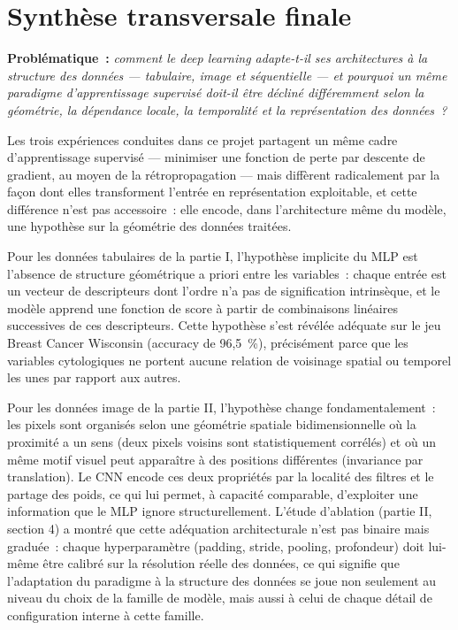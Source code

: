\documentclass[11pt,a4paper]{article}
\begin{document}
\newpage
\section{Synthèse transversale finale}

\noindent\textbf{Problématique~:} \textit{comment le deep learning adapte-t-il ses architectures à la structure des données --- tabulaire, image et séquentielle --- et pourquoi un même paradigme d'apprentissage supervisé doit-il être décliné différemment selon la géométrie, la dépendance locale, la temporalité et la représentation des données~?}

\medskip
Les trois expériences conduites dans ce projet partagent un même cadre d'apprentissage supervisé --- minimiser une fonction de perte par descente de gradient, au moyen de la rétropropagation --- mais diffèrent radicalement par la façon dont elles transforment l'entrée en représentation exploitable, et cette différence n'est pas accessoire~: elle encode, dans l'architecture même du modèle, une hypothèse sur la géométrie des données traitées.

Pour les données tabulaires de la partie I, l'hypothèse implicite du MLP est l'absence de structure géométrique a priori entre les variables~: chaque entrée est un vecteur de descripteurs dont l'ordre n'a pas de signification intrinsèque, et le modèle apprend une fonction de score à partir de combinaisons linéaires successives de ces descripteurs. Cette hypothèse s'est révélée adéquate sur le jeu Breast Cancer Wisconsin (accuracy de 96,5~\%), précisément parce que les variables cytologiques ne portent aucune relation de voisinage spatial ou temporel les unes par rapport aux autres.

Pour les données image de la partie II, l'hypothèse change fondamentalement~: les pixels sont organisés selon une géométrie spatiale bidimensionnelle où la proximité a un sens (deux pixels voisins sont statistiquement corrélés) et où un même motif visuel peut apparaître à des positions différentes (invariance par translation). Le CNN encode ces deux propriétés par la localité des filtres et le partage des poids, ce qui lui permet, à capacité comparable, d'exploiter une information que le MLP ignore structurellement. L'étude d'ablation (partie II, section 4) a montré que cette adéquation architecturale n'est pas binaire mais graduée~: chaque hyperparamètre (padding, stride, pooling, profondeur) doit lui-même être calibré sur la résolution réelle des données, ce qui signifie que l'adaptation du paradigme à la structure des données se joue non seulement au niveau du choix de la famille de modèle, mais aussi à celui de chaque détail de configuration interne à cette famille.
\end{document}
